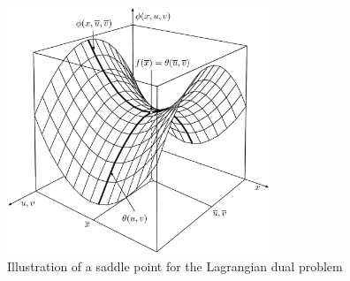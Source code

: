 \begin{figure}[H]
	\includegraphics[width=0.7\textwidth]{part_2/chapter_8/figures/KKT_saddle.pdf}
	\caption{Illustration of a saddle point for the Lagrangian dual problem}\label{KKT_saddle}
\end{figure}




